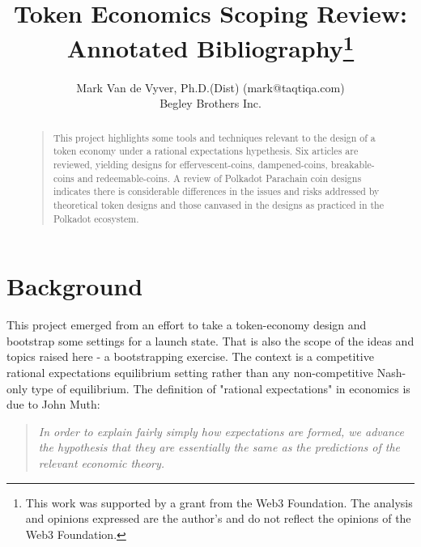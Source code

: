 \documentclass[11pt]{article}
\begin{document}


\title{Token Economics Scoping Review:\\Annotated Bibliography\footnote{This work was supported by a grant from the Web3 Foundation. The analysis and opinions expressed are the author's and do not reflect the opinions of the Web3 Foundation.}}
\author{Mark Van de Vyver, Ph.D.(Dist) (mark@taqtiqa.com)\\
Begley Brothers Inc.\\
}
\maketitle
\begin{abstract}
\begin{quote}
This project highlights some tools and techniques relevant to the design of a token economy under a rational expectations hypethesis.  Six articles are reviewed, yielding designs for effervescent-coins, dampened-coins, breakable-coins and redeemable-coins. A review of Polkadot Parachain coin designs indicates there is considerable differences in the issues and risks addressed by theoretical token designs and those canvased in the designs as practiced in the Polkadot ecosystem.
\end{quote}
\end{abstract}

\tableofcontents

\section{Background}
This project emerged from an effort to take a token-economy design and bootstrap some settings for a launch state. That is also the scope of the ideas and topics raised here - a bootstrapping exercise.  The context is a competitive rational expectations equilibrium setting rather than any non-competitive Nash-only type of equilibrium.
The definition of "rational expectations" in economics is due to John Muth\autocite{muth61}:

\begin{quote}
    \textit{In order to explain fairly simply how expectations are formed, we advance the hypothesis that they are essentially the same as the predictions of the relevant economic theory.}
\end{quote}
\end{document}
